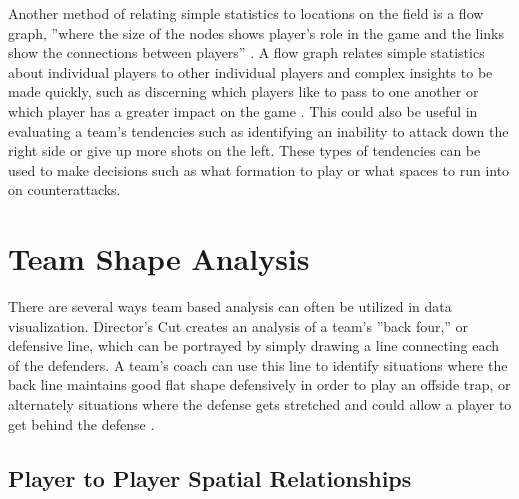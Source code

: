 \documentclass[sigconf]{acmart}
\begin{document}
Another method of relating simple statistics to locations on the field is a flow graph, ''where the size of the nodes shows player's role in the game and the links show the connections between players'' \cite{SoccerStories}. A flow graph relates simple statistics about individual players to other individual players and complex insights to be made quickly, such as discerning which players like to pass to one another or which player has a greater impact on the game \cite{SoccerStories}. This could also be useful in evaluating a team’s tendencies such as identifying an inability to attack down the right side or give up more shots on the left. These types of tendencies can be used to make decisions such as what formation to play or what spaces to run into on counterattacks.

\section{Team Shape Analysis}

There are several ways team based analysis can often be utilized in data visualization. Director's Cut creates an analysis of a team's ''back four,'' or defensive line, which can be portrayed by simply drawing a line connecting each of the defenders. A team's coach can use this line to identify situations where the back line maintains good flat shape defensively in order to play an offside trap, or alternately situations where the defense gets stretched and could allow a player to get behind the defense \cite{directorscut}.

\subsection{Player to Player Spatial Relationships}
\end{document}
